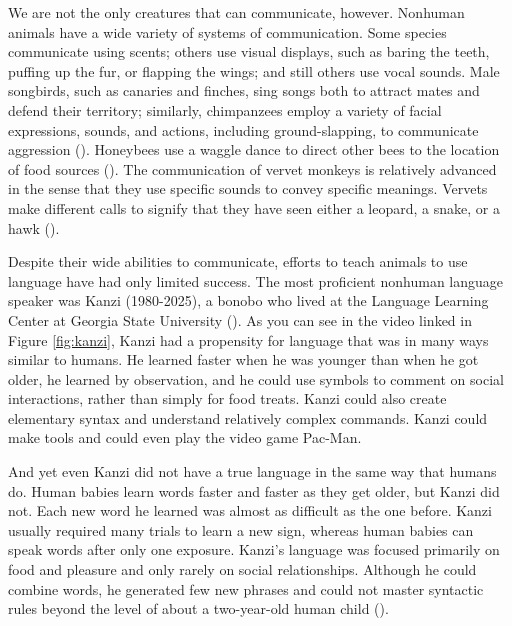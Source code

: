 \documentclass[
]{krantz}
\begin{document}
We are not the only creatures that can communicate, however. Nonhuman animals have a wide variety of systems of communication. Some species communicate using scents; others use visual displays, such as baring the teeth, puffing up the fur, or flapping the wings; and still others use vocal sounds. Male songbirds, such as canaries and finches, sing songs both to attract mates and defend their territory; similarly, chimpanzees employ a variety of facial expressions, sounds, and actions, including ground-slapping, to communicate aggression (). Honeybees use a waggle dance to direct other bees to the location of food sources (). The communication of vervet monkeys is relatively advanced in the sense that they use specific sounds to convey specific meanings. Vervets make different calls to signify that they have seen either a leopard, a snake, or a hawk ().

Despite their wide abilities to communicate, efforts to teach animals to use language have had only limited success. The most proficient nonhuman language speaker was Kanzi (1980-2025), a bonobo who lived at the Language Learning Center at Georgia State University (). As you can see in the video linked in Figure \ref{fig:kanzi}, Kanzi had a propensity for language that was in many ways similar to humans. He learned faster when he was younger than when he got older, he learned by observation, and he could use symbols to comment on social interactions, rather than simply for food treats. Kanzi could also create elementary syntax and understand relatively complex commands. Kanzi could make tools and could even play the video game Pac-Man.

And yet even Kanzi did not have a true language in the same way that humans do. Human babies learn words faster and faster as they get older, but Kanzi did not. Each new word he learned was almost as difficult as the one before. Kanzi usually required many trials to learn a new sign, whereas human babies can speak words after only one exposure. Kanzi's language was focused primarily on food and pleasure and only rarely on social relationships. Although he could combine words, he generated few new phrases and could not master syntactic rules beyond the level of about a two-year-old human child ().
\end{document}
